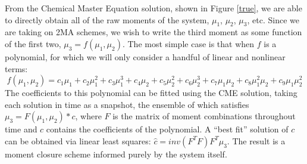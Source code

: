 \documentclass[a4paper,10pt]{article}
\begin{document}
From the Chemical Master Equation solution, shown in Figure \ref{true}, we are able to directly obtain all of the raw moments of the system, $\mu_1$, $\mu_2$, $\mu_3$, etc. Since we are taking on 2MA schemes, we wish to write the third moment as some function of the first two, $\mu_3=f\left(\mu_1, \mu_2\right)$. The most simple case is that when $f$ is a polynomial, for which we will only consider a handful of linear and nonlinear terms:
$$f\left(\mu_1, \mu_2\right)= c_1 \mu_1+c_2 \mu_1^2+c_3 \mu_1^3+c_4 \mu_2+c_5 \mu_2^2+c_6\mu_2^3+ c_7 \mu_1 \mu_2 + c_8\mu_1^2 \mu_2 +c_9\mu_1 \mu_2^2 $$
The coefficients to this polynomial can be fitted using the CME solution, taking each solution in time as a snapshot, the ensemble of which satisfies $\mu_3=F\left(\mu_1, \mu_2\right)*c$, where $F$ is the matrix of moment combinations throughout time and $c$ contains the coefficients of the polynomial. A ``best fit'' solution of $c$ can be obtained via linear least squares: $\hat{c}=inv\left(F^TF\right) F^T \mu_3$. The result is a moment closure scheme informed purely by the system itself. \\
\end{document}
